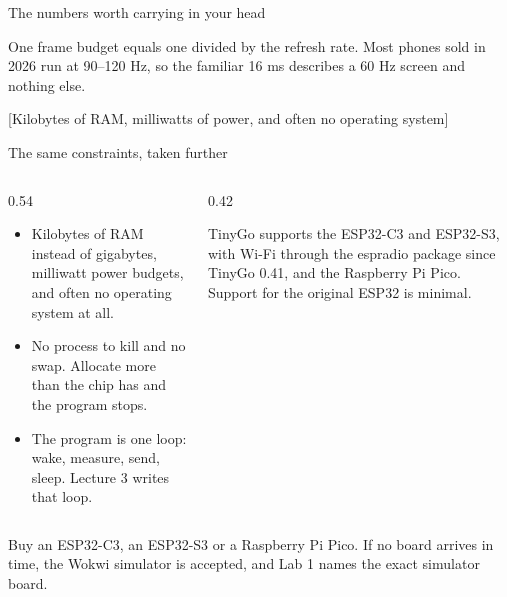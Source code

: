 \documentclass[10pt,aspectratio=169,t]{beamer}
\begin{document}
\begin{frame}[eyebrow=Device spectrum]{The numbers worth carrying in your head}
  \vskip 2mm
  \begin{grid}[3]
  \end{grid}
  \begin{takeaway}{One frame budget equals one divided by the refresh rate.}
    Most phones sold in 2026 run at 90–120 Hz, so the familiar 16 ms describes a 60 Hz screen and nothing else.
  \end{takeaway}
\end{frame}

[Kilobytes of RAM, milliwatts of power, and often no operating system]

\begin{frame}[embedded,eyebrow=Embedded]{The same constraints, taken further}
  \vskip 2mm
  \begin{columns}[T]
    \begin{column}{0.54\textwidth}
      \begin{itemize}
        \item Kilobytes of RAM instead of gigabytes, milliwatt power budgets, and often no operating system at all.
        \item No process to kill and no swap. Allocate more than the chip has and the program stops.
        \item The program is one loop: wake, measure, send, sleep. Lecture 3 writes that loop.
      \end{itemize}
    \end{column}
    \begin{column}{0.42\textwidth}
      \begin{hint}
        TinyGo supports the ESP32-C3 and ESP32-S3, with Wi-Fi through the espradio package since TinyGo 0.41, and the Raspberry Pi Pico. Support for the original ESP32 is minimal.
      \end{hint}
    \end{column}
  \end{columns}
  \begin{takeaway}{Buy an ESP32-C3, an ESP32-S3 or a Raspberry Pi Pico.}
    If no board arrives in time, the Wokwi simulator is accepted, and Lab 1 names the exact simulator board.
  \end{takeaway}
\end{frame}
\end{document}
